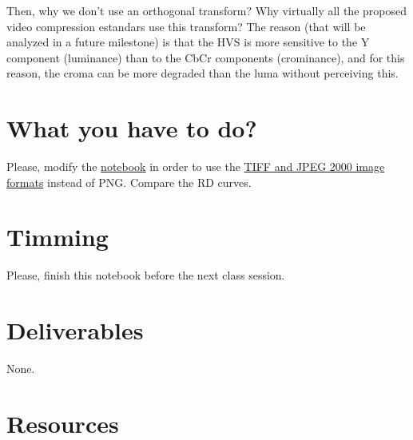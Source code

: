Then, why we don't use an orthogonal transform? Why virtually all the
proposed video compression estandars use this transform? The reason
(that will be analyzed in a future milestone) is that the HVS is more
sensitive to the Y component (luminance) than to the CbCr components
(crominance), and for this reason, the croma can be more degraded than
the luma without perceiving this.

\section{What you have to do?}
  
Please, modify the
\href{https://github.com/Sistemas-Multimedia/Sistemas-Multimedia.github.io/blob/master/study_guide/05-quantization/quantize_a_frame.ipynb}{notebook}
in order to use the
\href{https://docs.opencv.org/master/d4/da8/group__imgcodecs.html}{TIFF
  and JPEG 2000 image formats} instead of PNG. Compare the RD curves.

\section{Timming}

Please, finish this notebook before the next class session.

\section{Deliverables}

None.

\section{Resources}


